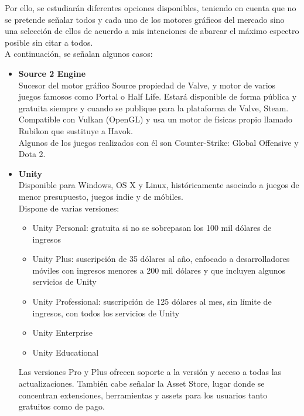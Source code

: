 \quad Por ello, se estudiarán diferentes opciones disponibles, teniendo en cuenta que no se pretende señalar todos y cada uno de los motores gráficos del mercado sino una
selección de ellos de acuerdo a mis intenciones de abarcar el máximo espectro posible sin citar a todos.\\

\quad A continuación, se señalan algunos casos:
\begin{itemize}
\item{\textbf{Source 2 Engine}}\\

\quad Sucesor del motor gráfico Source propiedad de Valve, y motor de varios juegos famosos como Portal o Half Life. Estará disponible de forma pública y gratuita siempre y cuando se publique para la plataforma de Valve, Steam. Compatible con Vulkan (OpenGL) y usa un motor de físicas propio llamado Rubikon que sustituye a Havok. \\

\quad Algunos de los juegos realizados con él son Counter-Strike: Global Offensive y Dota 2.\\ 

\item{\textbf{Unity}} \\

\quad Disponible para Windows, OS X y Linux, históricamente asociado a juegos de menor presupuesto, juegos indie y de móbiles.\\ 

\quad Dispone de varias versiones: 
\begin{itemize}
	\item Unity Personal: gratuita si no se sobrepasan los 100 mil dólares de ingresos
	\item Unity Plus: suscripción de 35 dólares al año, enfocado a desarrolladores móviles con ingresos menores a 200 mil dólares y que incluyen algunos servicios de Unity
	\item Unity Professional: suscripción de 125 dólares al mes, sin límite de ingresos, con todos los servicios de Unity
	\item Unity Enterprise
	\item Unity Educational 
\end{itemize}
\quad Las versiones Pro y Plus ofrecen soporte a la versión y acceso a todas las actualizaciones. También cabe señalar la Asset Store, lugar donde se concentran extensiones, herramientas y assets para los usuarios tanto gratuitos como de pago.\\


\end{itemize}
